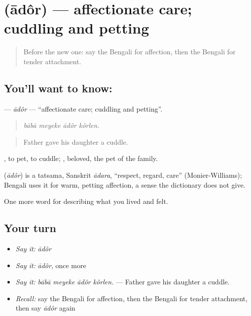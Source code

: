 \section[\texorpdfstring{\bn{আদর} (ādôr)}{আদর (ādôr)}]{ (ādôr) — affectionate care; cuddling and petting}

\label{lesson:BN-C449-ador}



\begin{quote}
Before the new one: say the Bengali for affection, then the Bengali for tender attachment.
\end{quote}

\subsection*{You'll want to know: }
\textbf{} — \emph{ādôr} — \textquotedblleft{}affectionate care; cuddling and petting\textquotedblright{}.

\begin{quote}
   
\end{quote}

\begin{quote}
\emph{bābā meyeke ādôr kôrlen.}
\end{quote}

\begin{quote}
Father gave his daughter a cuddle.
\end{quote}

 , to pet, to cuddle; , beloved, the pet of the family.

\begin{cousinweb}
\textbf{} (\emph{ādôr}) is a tatsama, Sanskrit \emph{ādara}, \textquotedblleft{}respect, regard, care\textquotedblright{} (Monier-Williams); Bengali uses it for warm, petting affection, a sense the dictionary does not give.
\end{cousinweb}

\begin{grammarlens}[title={What you've built}]
One more word for describing what you lived and felt.
\end{grammarlens}

\subsection*{Your turn}
\begin{itemize}
\raggedright
  \item \emph{Say it:} \emph{ādôr}
  \item \emph{Say it:} \emph{ādôr}, once more
  \item \emph{Say it:} \emph{bābā meyeke ādôr kôrlen.} — Father gave his daughter a cuddle.
  \item \emph{Recall:} say the Bengali for affection, then the Bengali for tender attachment, then say \emph{ādôr} again
\end{itemize}

